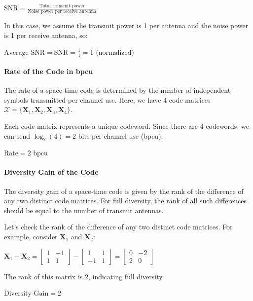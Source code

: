 \documentclass[11pt]{article}
\begin{document}
\(\text{SNR} = \frac{\text{Total transmit power}}{\text{Noise power per receive antenna}}\)

In this case, we assume the transmit power is 1 per antenna and the
noise power is 1 per receive antenna, so:

\(\text{Average SNR} = \text{SNR} = \frac{1}{1} = 1 \text{ (normalized)}\)

\paragraph{Rate of the Code in bpcu}\label{rate-of-the-code-in-bpcu}

The rate of a space-time code is determined by the number of independent
symbols transmitted per channel use. Here, we have 4 code matrices
\(\mathcal{X} = \{\mathbf{X}_1, \mathbf{X}_2, \mathbf{X}_3, \mathbf{X}_4\}\).

Each code matrix represents a unique codeword. Since there are 4
codewords, we can send \(\log_2(4) = 2\) bits per channel use (bpcu).

\(\text{Rate} = 2 \text{ bpcu}\)

\paragraph{Diversity Gain of the Code}\label{diversity-gain-of-the-code}

The diversity gain of a space-time code is given by the rank of the
difference of any two distinct code matrices. For full diversity, the
rank of all such differences should be equal to the number of transmit
antennas.

Let's check the rank of the difference of any two distinct code
matrices. For example, consider \(\mathbf{X}_1\) and \(\mathbf{X}_2\):

\(\mathbf{X}_1 - \mathbf{X}_2 = \begin{bmatrix} 1 & -1 \\ 1 & 1 \end{bmatrix} - \begin{bmatrix} 1 & 1 \\ -1 & 1 \end{bmatrix} = \begin{bmatrix} 0 & -2 \\ 2 & 0 \end{bmatrix}\)

The rank of this matrix is 2, indicating full diversity.

\(\text{Diversity Gain} = 2\)
\end{document}
